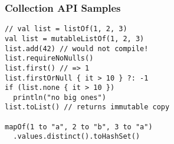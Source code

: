 \begin{frame}[fragile] \frametitle{Collection API Samples}
\begin{lstlisting}
// val list = listOf(1, 2, 3)
val list = mutableListOf(1, 2, 3)
list.add(42) // would not compile!
list.requireNoNulls()
list.first() // => 1
list.firstOrNull { it > 10 } ?: -1
if (list.none { it > 10 })
  println("no big ones")
list.toList() // returns immutable copy

mapOf(1 to "a", 2 to "b", 3 to "a")
  .values.distinct().toHashSet()

\end{lstlisting}
\end{frame}



